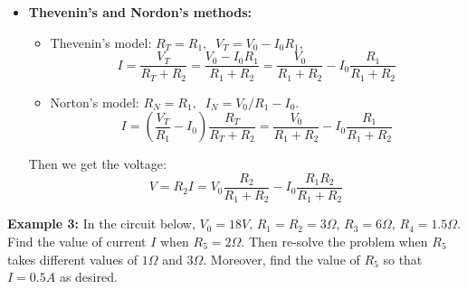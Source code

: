 \documentclass{article}
\begin{document}
\begin{itemize}
\item {\bf Thevenin's and Nordon's methods:}
  \begin{itemize}
  \item Thevenin's model: $R_T=R_1,\;\;V_T=V_0-I_0R_1$,
    \begin{equation}
      I=\frac{V_T}{R_T+R_2}=\frac{V_0-I_0R_1}{R_1+R_2}
      =\frac{V_0}{R_1+R_2}-I_0\frac{R_1}{R_1+R_2}
    \end{equation}
  \item Norton's model: $R_N=R_1,\;\;I_N=V_0/R_1-I_0$.
    \begin{equation}
      I=\left(\frac{V_T}{R_1}-I_0\right)\frac{R_T}{R_T+R_2}
      =\frac{V_0}{R_1+R_2}-I_0\frac{R_1}{R_1+R_2}
    \end{equation}
  \end{itemize}
  Then we get the voltage:
  \begin{equation}
    V=R_2 I=V_0\frac{R_2}{R_1+R_2}-I_0\frac{R_1R_2}{R_1+R_2}
  \end{equation}

\end{itemize}

\begin{comment}
{\bf Example 2:} (Homework)

In general, the conversion from $\Delta$ to $Y$ is more useful as $Y$ 
is easier to analyze than $\Delta$. For example, the circuit in (a) 
below can be converted to that in (b) to find all the currents in the 
circuit:

\htmladdimg{../figures/DeltaYEx.gif}

Assume $V_0=225 V$, $R_0=1\Omega$, $R_1=40\Omega$, $R_2=36\Omega$, 
$R_3=50\Omega$, $R_4=55\Omega$, $R_5=10\Omega$, find the currents 
$I_0$, $I_1$, $I_2$, $I_3$, $I_4$, and $I_5$. 
\end{comment}

{\bf Example 3: } In the circuit below, $V_0=18V$, $R_1=R_2=3\Omega$, 
$R_3=6\Omega$, $R_4=1.5\Omega$. Find the value of current $I$ when 
$R_5=2\Omega$. Then re-solve the problem when $R_5$ takes different
values of $1\Omega$ and $3\Omega$. Moreover, find the value of $R_5$ 
so that $I=0.5A$ as desired.

\end{document}
